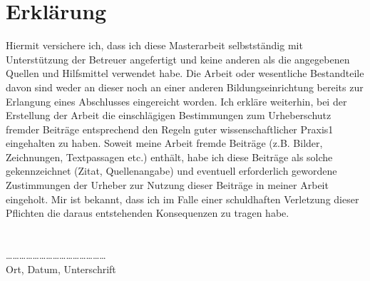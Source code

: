 \newpage
\chapter*{Erkl\"arung}
Hiermit versichere ich, dass ich diese Masterarbeit selbstständig mit Unterstützung der Betreuer angefertigt und keine
anderen als die angegebenen Quellen und Hilfsmittel verwendet habe.
Die Arbeit oder wesentliche Bestandteile davon sind weder an dieser noch an einer anderen Bildungseinrichtung bereits zur Erlangung eines Abschlusses eingereicht worden.
Ich erkläre weiterhin, bei der Erstellung der Arbeit die einschlägigen Bestimmungen zum Urheberschutz fremder Beiträge entsprechend den Regeln guter wissenschaftlicher Praxis1 eingehalten zu haben. Soweit meine Arbeit fremde Beiträge (z.B. Bilder, Zeichnungen, Textpassagen etc.) enthält, habe ich diese Beiträge als solche gekennzeichnet (Zitat, Quellenangabe) und eventuell erforderlich gewordene Zustimmungen der Urheber zur Nutzung dieser Beiträge in meiner Arbeit eingeholt. Mir ist bekannt, dass ich im Falle einer schuldhaften Verletzung dieser Pflichten die daraus entstehenden Konsequenzen zu tragen habe. 
\\
\\
\\

………………………………………\\
Ort, Datum, Unterschrift

